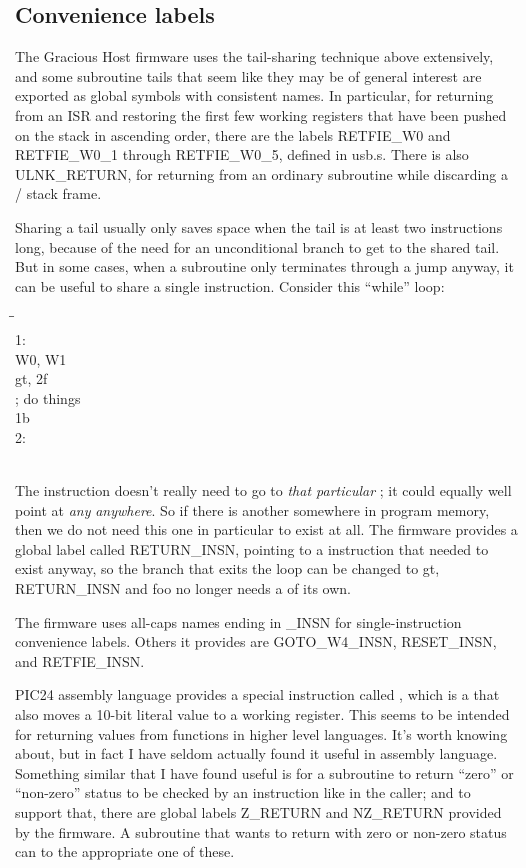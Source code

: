\subsection{Convenience labels}

The Gracious Host firmware uses the tail-sharing technique above
extensively, and some subroutine tails that seem like they may be of general
interest are exported as global symbols with consistent names.  In
particular, for returning from an ISR and restoring the first few working
registers that have been pushed on the stack in ascending order, there are
the labels RETFIE\_W0 and RETFIE\_W0\_1 through RETFIE\_W0\_5, defined in
usb.s.  There is also ULNK\_RETURN, for returning from an ordinary
subroutine while discarding a / stack frame.

Sharing a tail usually only saves space when the tail is at least two
instructions long, because of the need for an unconditional branch to get to
the shared tail.  But in some cases, when a subroutine only terminates
through a jump anyway, it can be useful to share a single instruction. 
Consider this ``while'' loop:
\begin{tabbing}
\qquad\=\qquad\qquad\=\kill
\\
1:\\
\>\>W0, W1\\
\>\>gt, 2f\\
\>; do things\\
\>\>1b\\
2:\\
\>\\
\end{tabbing}

The  instruction doesn't really need to go to \emph{that
particular} ; it could equally well point at \emph{any}
 \emph{anywhere}.  So if there is another 
somewhere in program memory, then we do not need this one in particular to
exist at all.  The firmware provides a global label called RETURN\_INSN,
pointing to a  instruction that needed to exist anyway, so the
branch that exits the loop can be changed to  gt, RETURN\_INSN
and foo no longer needs a  of its own.

The firmware uses all-caps names ending in \_INSN for single-instruction
convenience labels.  Others it provides are GOTO\_W4\_INSN, RESET\_INSN, and
RETFIE\_INSN.

PIC24 assembly language provides a special instruction called ,
which is a  that also moves a 10-bit literal value to a working
register.  This seems to be intended for returning values from functions in
higher level languages.  It's worth knowing about, but in fact I have seldom
actually found it useful in assembly language.  Something similar that I
have found useful is for a subroutine to return ``zero'' or ``non-zero''
status to be checked by an instruction like  in the caller; and
to support that, there are global labels Z\_RETURN and NZ\_RETURN provided
by the firmware.  A subroutine that wants to return with zero or non-zero
status can  to the appropriate one of these.

